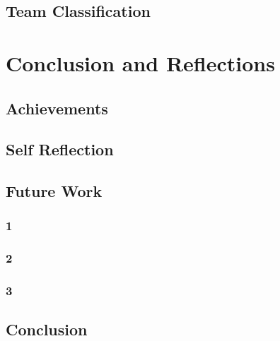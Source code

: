 \documentclass[12pt, letterpaper]{article}
\begin{document}
\subsection{Team Classification}
\newpage

\section{Conclusion and Reflections}

\subsection{Achievements}
\subsection{Self Reflection}
\subsection{Future Work}
\subsubsection{1}
\subsubsection{2}
\subsubsection{3}
\subsection{Conclusion}
\newpage


\end{document}
